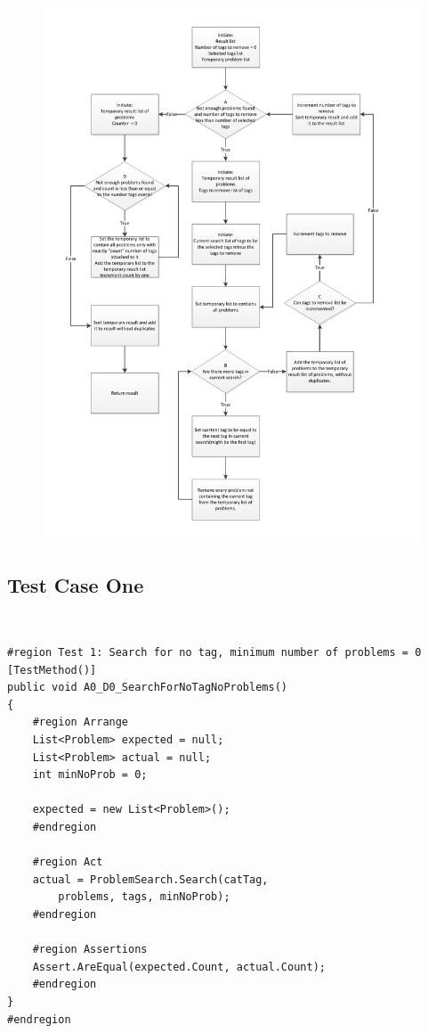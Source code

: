 \label{sec:unit_problem_search}
\begin{figure}[p]
	\centering
		\includegraphics[width=1.00\textwidth]{input/testing/problem_search.pdf}
	\label{fig:problem_search_flow}
\end{figure}


\subsection{Test Case One}\
\begin{lstlisting}[style=sourceCode, caption=\myCaption{The test case for no run of any loops}, label=src:noLoops,float=htb]
#region Test 1: Search for no tag, minimum number of problems = 0
[TestMethod()]
public void A0_D0_SearchForNoTagNoProblems()
{
	#region Arrange
	List<Problem> expected = null;
	List<Problem> actual = null;
	int minNoProb = 0;

	expected = new List<Problem>();
	#endregion

	#region Act
	actual = ProblemSearch.Search(catTag,
		problems, tags, minNoProb);
	#endregion

	#region Assertions
	Assert.AreEqual(expected.Count, actual.Count);
	#endregion
}
#endregion
\end{lstlisting}

